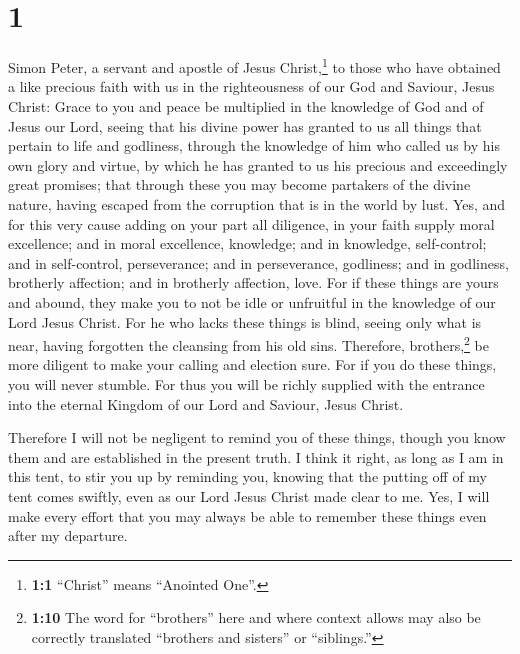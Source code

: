 \hypertarget{section}{%
\section{1}\label{section}}

 Simon Peter, a servant and apostle of Jesus
Christ,\footnote{\textbf{1:1} ``Christ'' means ``Anointed One''.} to
those who have obtained a like precious faith with us in the
righteousness of our God and Saviour, Jesus Christ:  Grace
to you and peace be multiplied in the knowledge of God and of Jesus our
Lord,  seeing that his divine power has granted to us all
things that pertain to life and godliness, through the knowledge of him
who called us by his own glory and virtue,  by which he
has granted to us his precious and exceedingly great promises; that
through these you may become partakers of the divine nature, having
escaped from the corruption that is in the world by lust. 
Yes, and for this very cause adding on your part all diligence, in your
faith supply moral excellence; and in moral excellence, knowledge;
 and in knowledge, self-control; and in self-control,
perseverance; and in perseverance, godliness;  and in
godliness, brotherly affection; and in brotherly affection, love.
 For if these things are yours and abound, they make you
to not be idle or unfruitful in the knowledge of our Lord Jesus Christ.
 For he who lacks these things is blind, seeing only what
is near, having forgotten the cleansing from his old sins.
 Therefore, brothers,\footnote{\textbf{1:10} The word for
  ``brothers'' here and where context allows may also be correctly
  translated ``brothers and sisters'' or ``siblings.''} be more diligent
to make your calling and election sure. For if you do these things, you
will never stumble.  For thus you will be richly supplied
with the entrance into the eternal Kingdom of our Lord and Saviour,
Jesus Christ.

 Therefore I will not be negligent to remind you of these
things, though you know them and are established in the present truth.
 I think it right, as long as I am in this tent, to stir
you up by reminding you,  knowing that the putting off of
my tent comes swiftly, even as our Lord Jesus Christ made clear to me.
 Yes, I will make every effort that you may always be
able to remember these things even after my departure.

